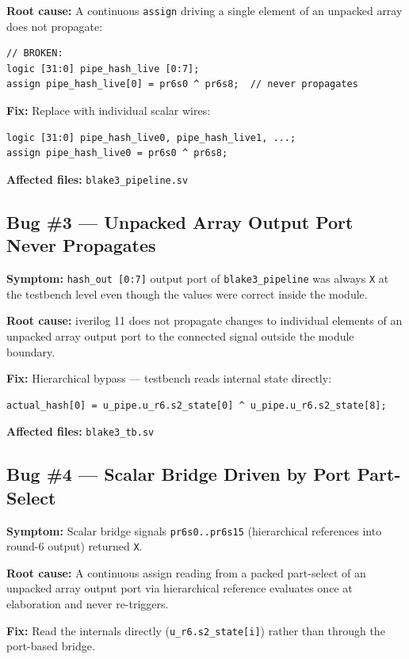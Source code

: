 \documentclass[11pt,a4paper]{article}
\begin{document}
\textbf{Root cause:} A continuous \texttt{assign} driving a single element of an
unpacked array does not propagate:
\begin{lstlisting}
// BROKEN:
logic [31:0] pipe_hash_live [0:7];
assign pipe_hash_live[0] = pr6s0 ^ pr6s8;  // never propagates
\end{lstlisting}

\textbf{Fix:} Replace with individual scalar wires:
\begin{lstlisting}
logic [31:0] pipe_hash_live0, pipe_hash_live1, ...;
assign pipe_hash_live0 = pr6s0 ^ pr6s8;
\end{lstlisting}

\textbf{Affected files:} \texttt{blake3\_pipeline.sv}

\subsection{Bug \#3 --- Unpacked Array Output Port Never Propagates}

\textbf{Symptom:} \texttt{hash\_out [0:7]} output port of \texttt{blake3\_pipeline}
was always \texttt{X} at the testbench level even though the values were
correct inside the module.

\textbf{Root cause:} iverilog 11 does not propagate changes to individual
elements of an unpacked array output port to the connected signal outside
the module boundary.

\textbf{Fix:} Hierarchical bypass --- testbench reads internal state directly:
\begin{lstlisting}
actual_hash[0] = u_pipe.u_r6.s2_state[0] ^ u_pipe.u_r6.s2_state[8];
\end{lstlisting}

\textbf{Affected files:} \texttt{blake3\_tb.sv}

\subsection{Bug \#4 --- Scalar Bridge Driven by Port Part-Select}

\textbf{Symptom:} Scalar bridge signals \texttt{pr6s0..pr6s15} (hierarchical
references into round-6 output) returned \texttt{X}.

\textbf{Root cause:} A continuous assign reading from a packed part-select
of an unpacked array output port via hierarchical reference evaluates
once at elaboration and never re-triggers.

\textbf{Fix:} Read the internals directly (\texttt{u\_r6.s2\_state[i]}) rather
than through the port-based bridge.
\end{document}
